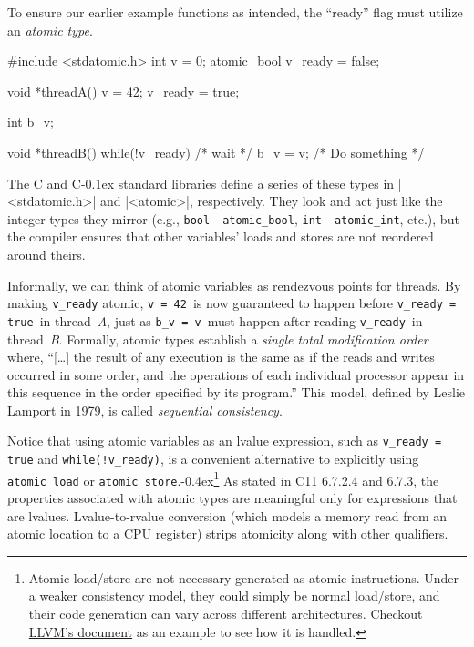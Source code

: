 \documentclass[fontsize=10pt, oneside]{scrartcl}
\newcommand{\punckern}{\kern-0.4ex}
\newcommand{\monobox}[1]{\mbox{\texttt{#1}}}
\newcommand{\cplusplus}[1]{C\kern-0.1ex\raisebox{0.15ex}{\texttt{++}}}
\newcommand{\clang}[1]{C}
\newcommand{\introduce}[1]{\textit{#1}}
\begin{document}
To ensure our earlier example functions as intended,
the ``ready'' flag must utilize an \introduce{atomic type}.
\begin{ccode}
#include <stdatomic.h>
int v = 0;
atomic_bool v_ready = false;

void *threadA()
{
    v = 42;
    v_ready = true;
}
\end{ccode}
\begin{ccode}
int b_v;

void *threadB()
{
    while(!v_ready) { /* wait */ }
    b_v = v;
    /* Do something */
}
\end{ccode}
The \clang{} and \cplusplus{} standard libraries define a series of these types in \cc|<stdatomic.h>| and \cpp|<atomic>|,
respectively.
They look and act just like the integer types they mirror (e.g., \monobox{bool}~\textrightarrow~\monobox{atomic\_bool},
\monobox{int}~\textrightarrow~\monobox{atomic\_int}, etc.),
but the compiler ensures that other variables' loads and stores are not reordered around theirs.

Informally, we can think of atomic variables as rendezvous points for threads.
By making \monobox{v\_ready} atomic,
\monobox{v = 42}\, is now guaranteed to happen before \monobox{v\_ready = true}\, in thread~\textit{A},
just as \monobox{b\_v = v}\, must happen after reading \monobox{v\_ready}\,
in thread~\textit{B}.
Formally, atomic types establish a \textit{single total modification order} where,
``[\ldots] the result of any execution is the same as if the reads and writes occurred in some order, and the operations of each individual processor appear in this sequence in the order specified by its program.''
This model, defined by Leslie Lamport in 1979,
is called \introduce{sequential consistency}.

Notice that using atomic variables as an lvalue expression, such as \monobox{v\_ready = true} and \monobox{while(!v\_ready)}, is a convenient alternative to explicitly using \monobox{atomic\_load} or \monobox{atomic\_store}.\punckern\footnote{%
Atomic load/store are not necessary generated as atomic instructions.
Under a weaker consistency model, they could simply be normal load/store,
and their code generation can vary across different architectures.
Checkout \href{https://llvm.org/docs/Atomics.html\#atomics-and-codegen}{LLVM's document} as an example to see how it is handled.}
As stated in C11 6.7.2.4 and 6.7.3, the properties associated with atomic types are meaningful only for expressions that are
lvalues.
Lvalue-to-rvalue conversion (which models a memory read from an atomic location to a CPU register) strips atomicity along with other qualifiers.
\end{document}
